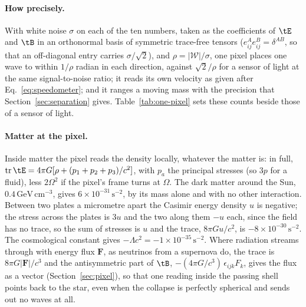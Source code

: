 \paragraph{How precisely.} With white noise $\sigma$ on each of the ten numbers,
taken as the coefficients of $\tE$ and $\tB$ in an orthonormal basis of
symmetric trace-free tensors ($e^A_{ij}e^B_{ij} = \delta^{AB}$, so that an
off-diagonal entry carries $\sigma/\sqrt2$), and $\rho = |\mathcal{W}|/\sigma$, one pixel places one wave to within $1/\rho$ radian in
each direction, against $\sqrt2/\rho$ for a sensor of light at the same
signal-to-noise ratio; it reads its own velocity as given after
Eq.~\eqref{eq:speedometer}; and it ranges a moving mass with the precision that
Section~\ref{sec:separation} gives. Table~\ref{tab:one-pixel} sets these
counts beside those of a sensor of light.

\paragraph{Matter at the pixel.} Inside matter the pixel reads the density
locally, whatever the matter is: in full,
$\mathrm{tr}\,\tE = 4\pi G[\rho + (p_1 + p_2 + p_3)/c^2]$, with $p_a$ the
principal stresses (so $3p$ for a fluid), less $2\Omega^2$ if the pixel's frame
turns at $\Omega$. The dark matter around the Sun, $0.4\,\mathrm{GeV\,cm^{-3}}$,
gives $6\times10^{-31}\,\mathrm{s^{-2}}$, by its mass alone and with no other
interaction. Between two plates a micrometre apart the Casimir energy density $u$ is
negative; the stress across the plates is $3u$ and the two along them $-u$
each, since the field has no trace, so the sum of stresses is $u$ and the trace,
$8\pi Gu/c^2$, is $-8\times10^{-30}\,\mathrm{s^{-2}}$. The cosmological constant gives
$-\Lambda c^2 = -1\times10^{-35}\,\mathrm{s^{-2}}$. Where radiation streams
through with energy flux $\mathbf F$, as neutrinos from a supernova do, the trace
is $8\pi G|\mathbf F|/c^3$ and the antisymmetric part of $\tB$,
$-(4\pi G/c^3)\,\epsilon_{ijk}F_k$, gives the flux as a vector
(Section~\ref{sec:pixel}), so that
one reading inside the passing shell points back to the star, even when the
collapse is perfectly spherical and sends out no waves at all.

